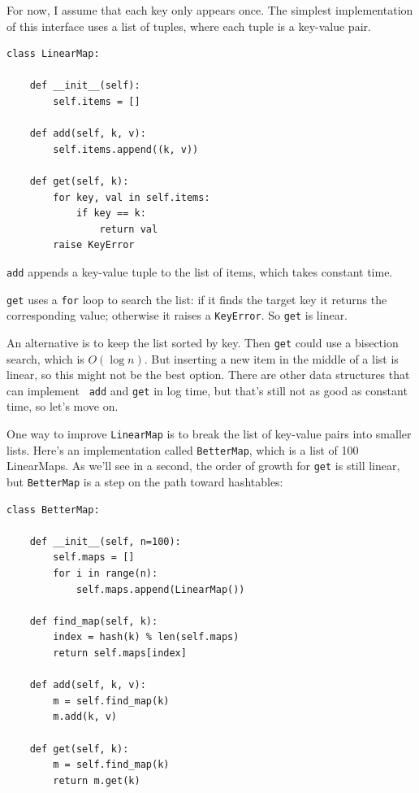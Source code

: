 \documentclass[10pt]{book}
\begin{document}
For now, I assume that each key only appears once.
The simplest implementation of this interface uses a list of
tuples, where each tuple is a key-value pair.

\begin{verbatim}
class LinearMap:

    def __init__(self):
        self.items = []

    def add(self, k, v):
        self.items.append((k, v))

    def get(self, k):
        for key, val in self.items:
            if key == k:
                return val
        raise KeyError
\end{verbatim}

{\tt add} appends a key-value tuple to the list of items, which
takes constant time.

{\tt get} uses a {\tt for} loop to search the list:
if it finds the target key it returns the corresponding value;
otherwise it raises a {\tt KeyError}.
So {\tt get} is linear.

An alternative is to keep the list sorted by key.  Then {\tt get}
could use a bisection search, which is $O(\log n)$.  But inserting a
new item in the middle of a list is linear, so this might not be the
best option.  There are other data structures that can implement {\tt
  add} and {\tt get} in log time, but that's still not as good as
constant time, so let's move on.

One way to improve {\tt LinearMap} is to break the list of key-value
pairs into smaller lists.  Here's an implementation called
{\tt BetterMap}, which is a list of 100 LinearMaps.  As we'll see
in a second, the order of growth for {\tt get} is still linear,
but {\tt BetterMap} is a step on the path toward hashtables:

\begin{verbatim}
class BetterMap:

    def __init__(self, n=100):
        self.maps = []
        for i in range(n):
            self.maps.append(LinearMap())

    def find_map(self, k):
        index = hash(k) % len(self.maps)
        return self.maps[index]

    def add(self, k, v):
        m = self.find_map(k)
        m.add(k, v)

    def get(self, k):
        m = self.find_map(k)
        return m.get(k)
\end{verbatim}
\end{document}
